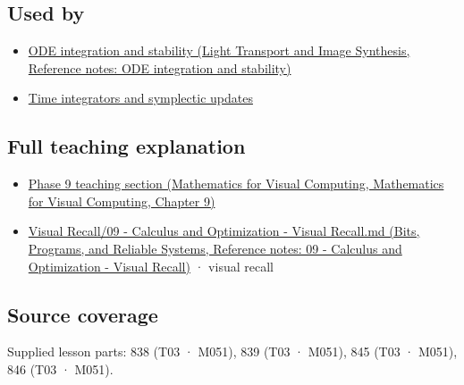 \subsection{Used by}\label{appendix-e8ab9836882e-used-by}

\begin{itemize}
\tightlist
\item
  \href{../04-Light-Transport-and-Image-Synthesis/main.pdf\#nameddest=appendix-18eacf61a04b}{ODE integration and stability (Light Transport and Image Synthesis, Reference notes: ODE integration and stability)}
\item
  \hyperref[appendix-8f96f9c4d5bc]{Time integrators and symplectic updates}
\end{itemize}

\subsection{Full teaching explanation}\label{appendix-e8ab9836882e-full-teaching-explanation}

\begin{itemize}
\tightlist
\item
  \href{../02-Mathematics-for-Visual-Computing/main.pdf\#nameddest=02-foundations-ii-ch025-odes-and-numerical-simulation}{Phase 9 teaching section (Mathematics for Visual Computing, Mathematics for Visual Computing, Chapter 9)}
\item
  \href{../01-Bits-Programs-and-Reliable-Systems/main.pdf\#nameddest=appendix-adf48f5dc5c1}{Visual Recall/09 - Calculus and Optimization - Visual Recall.md (Bits, Programs, and Reliable Systems, Reference notes: 09 - Calculus and Optimization - Visual Recall)} · visual recall
\end{itemize}

\subsection{Source coverage}\label{appendix-e8ab9836882e-source-coverage}

Supplied lesson parts: 838 (T03 · M051), 839 (T03 · M051), 845 (T03 · M051), 846 (T03 · M051).
